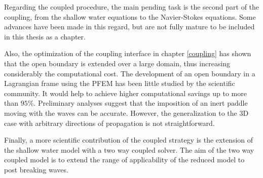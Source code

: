 Regarding the coupled procedure, the main pending task is the second part of the coupling, from the shallow water equations to the Navier-Stokes equations. Some advances have been made in this regard, but are not fully mature to be included in this thesis as a chapter.

Also, the optimization of the coupling interface in chapter \ref{coupling} has shown that the open boundary is extended over a large domain, thus increasing considerably the computational cost. The development of an open boundary in a Lagrangian frame using the PFEM has been little studied by the scientific community. It would help to achieve higher computational savings up to more than $95\%$. Preliminary analyses suggest that the imposition of an inert paddle moving with the waves can be accurate. However, the generalization to the 3D case with arbitrary directions of propagation is not straightforward.

Finally, a more scientific contribution of the coupled strategy is the extension of the shallow water model with a two way coupled solver. The aim of the two way coupled model is to extend the range of applicability of the reduced model to post breaking waves.

